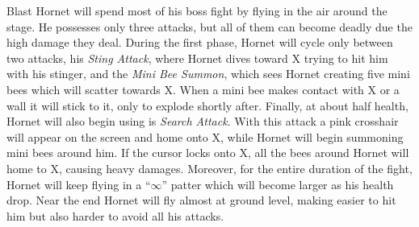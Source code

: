Blast Hornet will spend most of his boss fight by flying in the air around the stage. He possesses only three attacks, but all of them can become deadly due the high damage they deal. During the first phase, Hornet will cycle only between two attacks, his \emph{Sting Attack}, where Hornet dives toward X trying to hit him with his stinger, and the \emph{Mini Bee Summon}, which sees Hornet creating five mini bees which will scatter towards X. When a mini bee makes contact with X or a wall it will stick to it, only to explode shortly after. Finally, at about half health, Hornet will also begin using is \emph{Search Attack}. With this attack a pink crosshair will appear on the screen and home onto X, while Hornet will begin summoning mini bees around him. If the cursor locks onto X, all the bees around Hornet will home to X, causing heavy damages. Moreover, for the entire duration of the fight, Hornet will keep flying in a ``$\infty$'' patter which will become larger as his health drop. Near the end Hornet will fly almost at ground level, making  easier to hit him but also harder to avoid all his attacks.

